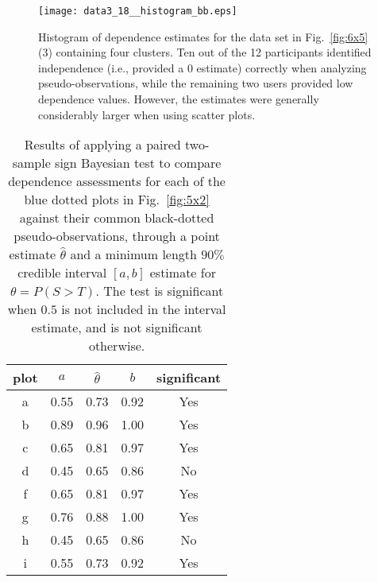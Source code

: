 \documentclass[journal]{vgtc}                %
\begin{document}
\begin{figure}[ht!]
    \centering

     \texttt{[image: data3\_18\_\_histogram\_bb.eps]}


  \caption{Histogram of dependence estimates for the data set in Fig.~\ref{fig:6x5}(3) containing four clusters. Ten out of the 12 participants identified independence (i.e., provided a 0 estimate) correctly when analyzing pseudo-observations, while the remaining two users provided low dependence values. However, the estimates were generally considerably larger when using scatter plots.}
\label{fig:histograms_independence_estimates}
\end{figure}


\begin{table}[h!]
    \centering
    \renewcommand{\arraystretch}{1.1}
    \begin{tabular}{|c|c|c|c|c|} \hline 
        plot & $a$ & $\hat{\theta}$ & $b$ & significant \\ \hline 
           a & 0.55 & 0.73 & 0.92 & Yes \\
           b & 0.89 & 0.96 & 1.00 & Yes \\
           c & 0.65 & 0.81 & 0.97 & Yes \\
           d & 0.45 & 0.65 & 0.86 & No \\
           f & 0.65 & 0.81 & 0.97 & Yes \\
           g & 0.76 & 0.88 & 1.00 & Yes \\
           h & 0.45 & 0.65 & 0.86 & No \\
           i & 0.55 & 0.73 & 0.92 & Yes \\ \hline
    \end{tabular} \\ \medskip
    
    \caption{Results of applying a paired two-sample sign Bayesian test to compare dependence assessments for each of the blue dotted plots in Fig.~\ref{fig:5x2} against their common black-dotted pseudo-observations, through a point estimate $\hat{\theta}$ and a minimum length $90\%$ credible interval $[a,b]$ estimate for $\theta=P(S>T).$ The test is significant when $0.5$ is not included in the interval estimate, and is not significant otherwise.
    }
    \label{tab:plots9}
\end{table}
\end{document}
